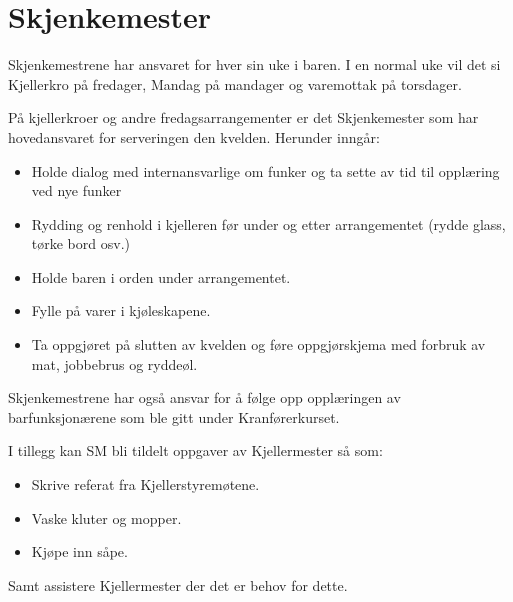 \section{Skjenkemester}
Skjenkemestrene har ansvaret for hver sin uke i baren. I en normal uke vil det si Kjellerkro på fredager, Mandag på mandager og varemottak på torsdager.

På kjellerkroer og andre fredagsarrangementer er det Skjenkemester som har hovedansvaret for serveringen den kvelden. Herunder inngår: 

\begin{itemize}
\item Holde dialog med internansvarlige om funker og ta sette av tid til opplæring ved nye funker
\item Rydding og renhold i kjelleren før under og etter arrangementet (rydde glass, tørke bord osv.)
\item Holde baren i orden under arrangementet.
\item Fylle på varer i kjøleskapene.
\item Ta oppgjøret på slutten av kvelden og føre oppgjørskjema med forbruk av mat, jobbebrus og ryddeøl. 
\end{itemize}

Skjenkemestrene har også ansvar for å følge opp
opplæringen av barfunksjonærene som ble gitt under Kranførerkurset.

I tillegg kan SM bli tildelt oppgaver av Kjellermester så som:
\begin{itemize}
\item Skrive referat fra Kjellerstyremøtene.
\item Vaske kluter og mopper.
\item Kjøpe inn såpe.
\end{itemize}

Samt assistere Kjellermester der det er behov for dette.
